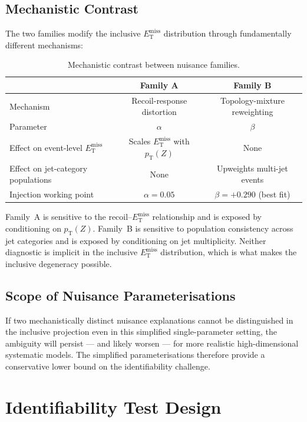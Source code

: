 \documentclass[a4paper,11pt]{article}
\newcommand{\MET}{\ensuremath{E_{\mathrm{T}}^{\mathrm{miss}}}\xspace}
\newcommand{\pTZ}{\ensuremath{p_{\mathrm{T}}(Z)}\xspace}
\begin{document}
\subsection{Mechanistic Contrast}

The two families modify the inclusive \MET distribution through
fundamentally different mechanisms:

\begin{table}[H]
  \centering
  \caption{Mechanistic contrast between nuisance families.}
  \label{tab:contrast}
  \begin{tabular}{lcc}
    \toprule
    & Family A & Family B \\
    \midrule
    Mechanism & Recoil-response distortion & Topology-mixture reweighting \\
    Parameter & $\alpha$ & $\beta$ \\
    Effect on event-level \MET & Scales \MET with \pTZ & None \\
    Effect on jet-category populations & None & Upweights multi-jet events \\
    Injection working point & $\alpha = 0.05$ & $\beta = +0.290$ (best fit) \\
    \bottomrule
  \end{tabular}
\end{table}

Family~A is sensitive to the recoil--\MET relationship and is exposed by
conditioning on \pTZ.
Family~B is sensitive to population consistency across jet categories and is
exposed by conditioning on jet multiplicity.
Neither diagnostic is implicit in the inclusive \MET distribution, which is
what makes the inclusive degeneracy possible.

\subsection{Scope of Nuisance Parameterisations}

If two mechanistically distinct nuisance explanations cannot be distinguished
in the inclusive projection even in this simplified single-parameter setting,
the ambiguity will persist --- and likely worsen --- for more realistic
high-dimensional systematic models.
The simplified parameterisations therefore provide a conservative lower bound
on the identifiability challenge.

\section{Identifiability Test Design}
\label{sec:design}
\end{document}
